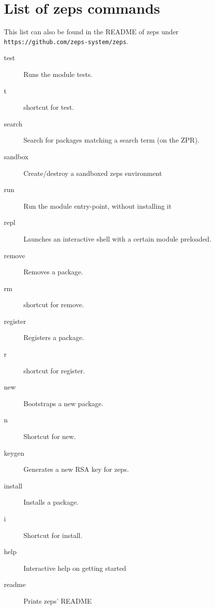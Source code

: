 \documentclass[oneside,11pt,xetex]{scrbook}
\begin{document}
\chapter{List of \gls{zeps} commands}
\label{app:zepscmds}

This list can also be found in the README of zeps under
\texttt{https://github.com/zeps-system/zeps}.

\begin{description}
\item [test] Runs the module tests.
\item [t] shortcut for test.
\item [search] Search for packages matching a search term (on the ZPR).
\item [sandbox] Create/destroy a sandboxed zeps environment
\item [run] Run the module entry-point, without installing it
\item [repl] Launches an interactive shell with a certain module preloaded.
\item [remove] Removes a package.
\item [rm] shortcut for remove.
\item [register] Registers a package.
\item [r] shortcut for register.
\item [new] Bootstraps a new package.
\item [n] Shortcut for new.
\item [keygen] Generates a new RSA key for zeps.
\item [install] Installs a package.
\item [i] Shortcut for install.
\item [help] Interactive help on getting started
\item [readme] Prints zeps' README
\end{description}

\backmatter


\printbibliography[title=References,heading=bibintoc]
\end{document}
